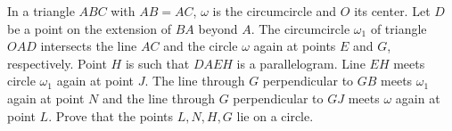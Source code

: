 In a triangle $ABC$ with $AB=AC$,  $\omega$ is the circumcircle and $O$ its center. Let $D$ be a point on the extension of $BA$ beyond $A$. The circumcircle $\omega_{1}$ of triangle $OAD$ intersects the line $AC$ and the circle $\omega$ again at points $E$ and $G$,  respectively. Point $H$ is such that $DAEH$ is a parallelogram. Line $EH$ meets circle $\omega_{1}$ again at point $J$. The line through $G$ perpendicular to $GB$ meets $\omega_{1}$ again at point $N$ and the line through $G$ perpendicular to $GJ$ meets $\omega$ again at point $L$. Prove that the points $L, N, H, G$ lie on a circle.